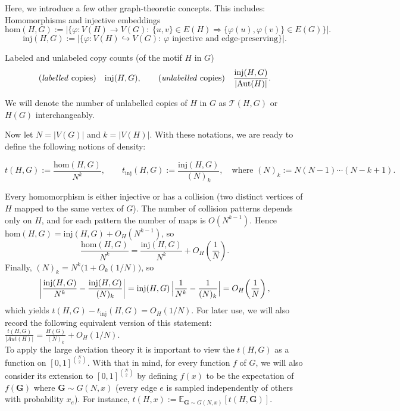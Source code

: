 \documentclass[12pt]{article}
\newcommand{\homc}{\mathrm{hom}}
\newcommand{\injc}{\mathrm{inj}}
\newcommand{\Aut}{\mathrm{Aut}}
\newcommand{\fall}[2]{(#1)_{#2}} %
\numberwithin{equation}{section}
\begin{document}
Here, we introduce a few other graph-theoretic concepts. This includes: \\

Homomorphisms and injective embeddings
\[
\homc(H,G)
:= \bigl|\{\varphi: V(H)\to V(G): \ \{u,v\}\in E(H)\Rightarrow \{\varphi(u),\varphi(v)\}\in E(G)\}\bigr|.
\]
\[
\injc(H,G)
:= \bigl|\{\varphi: V(H)\hookrightarrow V(G): \ \varphi \text{ injective and edge-preserving}\}\bigr|.
\]

Labeled and unlabeled copy counts (of the motif $H$ in $G$)
\[
\text{(\emph{labelled} copies)}\quad \injc(H,G), 
\qquad
\text{(\emph{unlabelled} copies)}\quad \frac{\injc(H,G)}{|\Aut(H)|}.
\]

We will denote the number of unlabelled copies of \(H\) in \(G\) as 
$\mathcal{T}(H, G)$ or $H(G)$ interchangeably. 


Now let \(N=|V(G)|\) and \(k=|V(H)|\). With these notations, we are ready to define the following notions of density:

\[
t(H,G) := \frac{\homc(H,G)}{N^k},
\qquad
t_{\mathrm{inj}}(H,G) := \frac{\injc(H,G)}{\fall{N}{k}},
\quad \text{where } \fall{N}{k} := N(N-1)\cdots(N-k+1).
\]


Every homomorphism is either injective or has a collision (two distinct vertices of \(H\) mapped to the same vertex of \(G\)).
The number of collision patterns depends only on \(H\), and for each pattern the number of maps is $O(N^{k-1})$.
Hence $\homc(H,G) = \injc(H,G) + O_H(N^{k-1})$, so
\[
\frac{\homc(H,G)}{N^k} = \frac{\injc(H,G)}{N^k} + O_H\!\left(\frac{1}{N}\right).
\]
Finally, $\fall{N}{k} = N^k\bigl(1+O_k(1/N)\bigr)$, so
\[
\left|\frac{\injc(H,G)}{N^k} - \frac{\injc(H,G)}{\fall{N}{k}}\right|
= \injc(H,G)\,\Bigl|\frac{1}{N^k}-\frac{1}{\fall{N}{k}}\Bigr|
= O_H\!\left(\frac{1}{N}\right),
\]
which yields $t(H,G) - t_{\mathrm{inj}}(H,G) = O_H(1/N)$. For later use, we will also record the following equivalent version of this statement: \(\frac{t(H,G)}{\lvert Aut(H)\rvert}  = \frac{H(G)}{(N)_k} + O_H(1/N)\).
\\

To apply the large deviation theory it is important to view the \(t(H,G)\) as a function on \([0,1]^{{N\choose 2}}\). With that in mind, for every function \(f\) of \(G\), we will also consider its extension to \([0,1]^{{N\choose 2}}\) by defining \(f(x)\) to be the expectation of \(f(\mathbf{G})\) where \(\mathbf{G}\sim G(N,x)\) (every edge \(e\) is sampled independently of others with probability \(x_e\)). For instance, \(t(H,x):=\mathbb{E}_{\mathbf{G}\sim G(N,x)}[t(H,\mathbf{G})]\).
\end{document}

